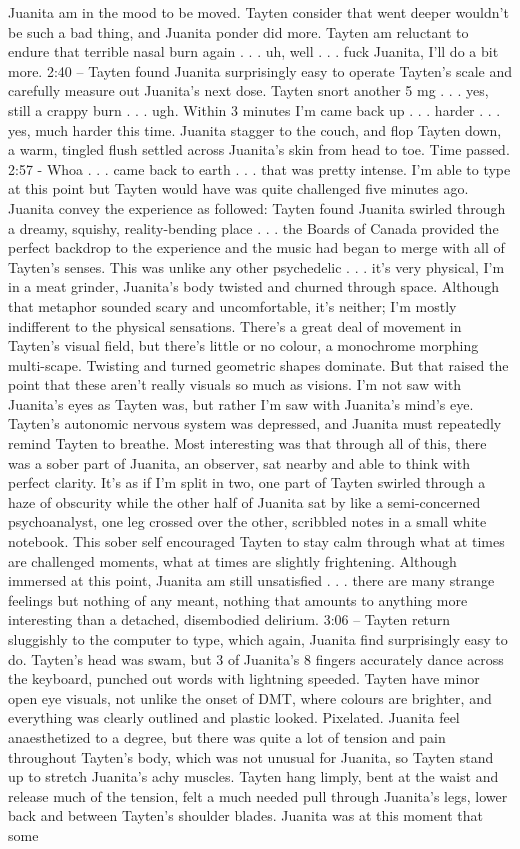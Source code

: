 \documentclass[12pt]{book}
\begin{document}
Juanita am in the mood to be moved. Tayten consider that went deeper wouldn't be such a bad thing, and Juanita ponder did more. Tayten am reluctant to endure that terrible nasal burn again  . . .  uh, well  . . .  fuck Juanita, I'll do a bit more. 2:40 -- Tayten found Juanita surprisingly easy to operate Tayten's scale and carefully measure out Juanita's next dose. Tayten snort another 5 mg  . . .  yes, still a crappy burn  . . .  ugh. Within 3 minutes I'm came back up  . . .  harder  . . .  yes, much harder this time. Juanita stagger to the couch, and flop Tayten down, a warm, tingled flush settled across Juanita's skin from head to toe. Time passed. 2:57 - Whoa  . . .  came back to earth  . . .  that was pretty intense. I'm able to type at this point but Tayten would have was quite challenged five minutes ago. Juanita convey the experience as followed: Tayten found Juanita swirled through a dreamy, squishy, reality-bending place  . . .  the Boards of Canada provided the perfect backdrop to the experience and the music had began to merge with all of Tayten's senses. This was unlike any other psychedelic  . . .  it's very physical, I'm in a meat grinder, Juanita's body twisted and churned through space. Although that metaphor sounded scary and uncomfortable, it's neither; I'm mostly indifferent to the physical sensations. There's a great deal of movement in Tayten's visual field, but there's little or no colour, a monochrome morphing multi-scape. Twisting and turned geometric shapes dominate. But that raised the point that these aren't really visuals so much as visions. I'm not saw with Juanita's eyes as Tayten was, but rather I'm saw with Juanita's mind's eye. Tayten's autonomic nervous system was depressed, and Juanita must repeatedly remind Tayten to breathe. Most interesting was that through all of this, there was a sober part of Juanita, an observer, sat nearby and able to think with perfect clarity. It's as if I'm split in two, one part of Tayten swirled through a haze of obscurity while the other half of Juanita sat by like a semi-concerned psychoanalyst, one leg crossed over the other, scribbled notes in a small white notebook. This sober self encouraged Tayten to stay calm through what at times are challenged moments, what at times are slightly frightening. Although immersed at this point, Juanita am still unsatisfied  . . .  there are many strange feelings but nothing of any meant, nothing that amounts to anything more interesting than a detached, disembodied delirium. 3:06 -- Tayten return sluggishly to the computer to type, which again, Juanita find surprisingly easy to do. Tayten's head was swam, but 3 of Juanita's 8 fingers accurately dance across the keyboard, punched out words with lightning speeded. Tayten have minor open eye visuals, not unlike the onset of DMT, where colours are brighter, and everything was clearly outlined and plastic looked. Pixelated. Juanita feel anaesthetized to a degree, but there was quite a lot of tension and pain throughout Tayten's body, which was not unusual for Juanita, so Tayten stand up to stretch Juanita's achy muscles. Tayten hang limply, bent at the waist and release much of the tension, felt a much needed pull through Juanita's legs, lower back and between Tayten's shoulder blades. Juanita was at this moment that some 
\end{document}

